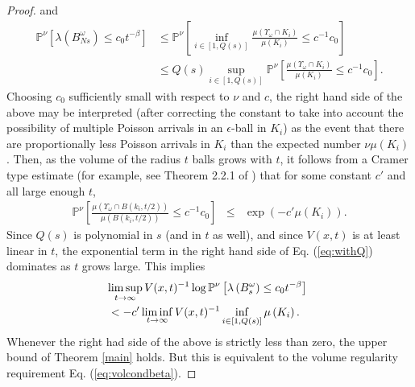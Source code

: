 \documentclass[letterpaper,oneside,english]{amsart}
\begin{document}
\begin{proof}
and 
\begin{align}
\mathbb{P}^{\nu}\left[\lambda\left(B_{Ns}^{\omega}\right)\leq c_{0}t^{-\beta}\right] & \le\mathbb{P}^{\nu}\left[\inf_{i\in[1,Q(s)]}\frac{\mu\left({\Upsilon_{\omega}}\cap K_{i} \right)}{\mu\left(K_{i}\right)}\leq c^{-1}c_{0}\right]\\
 & \le Q(s)\sup_{i\in[1,Q(s)]}\mathbb{P}^{\nu}\left[\frac{\mu\left( {\Upsilon_{\omega}}\cap K_{i} \right)}{\mu\left(K_{i}\right)}\leq c^{-1}c_{0}\right].\label{eq:withQ}\end{align}
Choosing $c_{0}$ sufficiently small with respect to $\nu$ 
and $c$, the right hand side of the above may be interpreted (after correcting the constant to take into account the possibility of multiple Poisson arrivals in an $\epsilon$-ball in $K_i$) as the event that there are proportionally less Poisson arrivals in $K_i$ than the expected number $\nu\mu(K_i)$.  Then, as the volume of the radius $t$ balls grows with $t$, it follows from a Cramer type estimate (for example, see Theorem 2.2.1 of \cite{Dembo}) that for some constant $c'$ and all large enough $t$,
\begin{eqnarray*}
\mathbb{P}^{\nu}\left[\frac{\mu\left({\Upsilon_{\omega}}\cap B\left(k_{i},t/2\right)\right)}{\mu\left(B\left(k_{i},t/2\right)\right)}\leq c^{-1}c_{0}\right] & \leq & \exp\left(-c'\mu\left(K_{i}\right)\right).
\end{eqnarray*}
Since $Q(s)$ is polynomial in $s$ (and in $t$ as well), and since $V(x,t)$ is at least linear in $t$, the exponential term in the right hand side of Eq. (\ref{eq:withQ}) dominates as $t$ grows large. This implies  
\begin{align*}
\lefteqn{\limsup_{t\to\infty}V(x,t)^{-1}\log\mathbb{P}^{\nu}\left[\lambda\left(B_{s}^{\omega}\right)\leq c_{0}t^{-\beta}\right]}\\
 & <-c'\liminf_{t\to\infty}V(x,t)^{-1}\inf_{i\in[1,Q(s)]}\mu\left(K_{i}\right).
 \end{align*}
 Whenever the right had side of the above is strictly less than zero, the upper bound of Theorem \ref{main} holds.  But this is equivalent to the volume regularity requirement Eq. (\ref{eq:volcondbeta}).
\end{proof}
\end{document}

